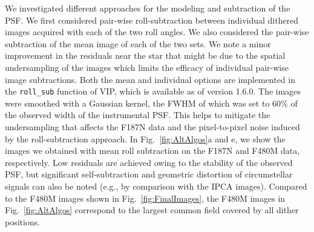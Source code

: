 \documentclass[longauth]{aa}
\newcommand{\vc}[1]{#1}
\begin{document}
\begin{appendix}
    We investigated different approaches for the modeling and subtraction of the PSF.
    We first considered pair-wise roll-subtraction \citep[e.g.][]{Schneider2003} between individual dithered images acquired with each of the two roll angles. We also considered the pair-wise subtraction of the mean image of each of the two sets. We note a minor improvement in the residuals near the star that might be due to the spatial undersampling of the images \vc{which limits} the efficacy of individual pair-wise image subtractions. Both the mean and individual options are implemented in the \texttt{roll\_sub} function of VIP, which is available as of version 1.6.0. %
    The images were smoothed with a Gaussian kernel, the FWHM of which was set to 60\% of the observed width of the instrumental PSF. This helps to mitigate the undersampling that affects the F187N data and the pixel-to-pixel noise induced by the roll-subtraction approach. In Fig.~\ref{fig:AltAlgos}a and e, we show the images we obtained with mean roll subtraction on the F187N and F480M data, respectively. Low residuals are achieved owing to the stability of the observed PSF, but significant self-subtraction and geometric distortion of circumstellar signals can also be noted (e.g., by comparison with the IPCA images). Compared to the F480M images shown in Fig.~\ref{fig:FinalImages}, the F480M images in Fig.~\ref{fig:AltAlgos} correspond to the largest common field covered by all dither positions.


\end{appendix}
\end{document}
